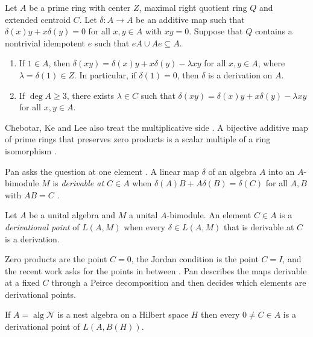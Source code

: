 \begin{theorem}\label{thm:local:cklzero}
Let $A$ be a prime ring with center $Z$, maximal right quotient ring $Q$
and extended centroid $C$. Let $\delta\colon A\to A$ be an additive map such
that $\delta(x)y+x\delta(y)=0$ for all $x,y\in A$ with $xy=0$. Suppose that
$Q$ contains a nontrivial idempotent $e$ such that $eA\cup Ae\subseteq A$.
\begin{enumerate}
\item If $1\in A$, then $\delta(xy)=\delta(x)y+x\delta(y)-\lambda xy$ for
all $x,y\in A$, where $\lambda=\delta(1)\in Z$. In particular, if
$\delta(1)=0$, then $\delta$ is a derivation on $A$.
\item If $\deg A\geq 3$, there exists $\lambda\in C$ such that
$\delta(xy)=\delta(x)y+x\delta(y)-\lambda xy$ for all $x,y\in A$.
\end{enumerate}
\end{theorem}

Chebotar, Ke and Lee also treat the multiplicative side
\cite[p.~217]{ChebotarKeLee2004}. A bijective
additive map of prime rings that preserves zero products is a scalar
multiple of a ring isomorphism
\cite[Theorem~1, pp.~217--218]{ChebotarKeLee2004}.

Pan asks the question at one element
\cite[p.~4251]{Pan2012Derivable}. A linear map $\delta$ of an algebra
$A$ into an $A$-bimodule $M$ is \emph{derivable at $C\in A$} when
$\delta(A)B+A\delta(B)=\delta(C)$ for all $A,B$ with $AB=C$
\cite[p.~4251]{Pan2012Derivable}.

\begin{definition}\label{def:local:derivpoint}
Let $A$ be a unital algebra and $M$ a unital $A$-bimodule. An element $C\in
A$ is a \emph{derivational point} of $L(A,M)$ when every $\delta\in L(A,M)$
that is derivable at $C$ is a derivation.
\end{definition}

Zero products are the point $C=0$, the Jordan condition is the point $C=I$,
and the recent work asks for the points in between
\cite[p.~4251]{Pan2012Derivable}. Pan describes the maps derivable at a
fixed $C$ through a Peirce decomposition
\cite[Theorem~2.1, p.~4253]{Pan2012Derivable} and then decides which
elements are derivational points.

\begin{theorem}\label{thm:local:derivpoint}
If $A=\operatorname{alg}\mathcal{N}$ is a nest algebra on a Hilbert space
$H$ then every $0\neq C\in A$ is a derivational point of $L(A,B(H))$.
\end{theorem}

